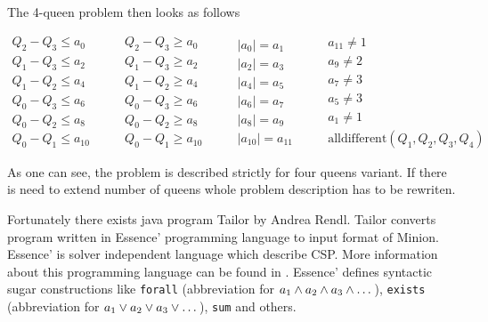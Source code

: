 The 4-queen problem then looks as follows

\begin{equation*}
\begin{gathered}
Q_2 - Q_3 \leq a_0 \\
Q_1 - Q_3 \leq a_2 \\
Q_1 - Q_2 \leq a_4 \\
Q_0 - Q_3 \leq a_6 \\
Q_0 - Q_2 \leq a_8 \\
Q_0 - Q_1 \leq a_{10}
\end{gathered} \qquad \begin{gathered}
Q_2 - Q_3 \geq a_0 \\
Q_1 - Q_3 \geq a_2 \\
Q_1 - Q_2 \geq a_4 \\
Q_0 - Q_3 \geq a_6 \\
Q_0 - Q_2 \geq a_8 \\
Q_0 - Q_1 \geq a_{10}
\end{gathered} \qquad \begin{gathered}
| a_0 | = a_1 \\
| a_2 | = a_3 \\
| a_4 | = a_5 \\
| a_6 | = a_7 \\
| a_8 | = a_9 \\
| a_{10} | = a_{11}
\end{gathered} \qquad \begin{gathered}
a_{11} \neq 1 \\
a_9 \neq 2 \\
a_7 \neq 3 \\
a_5 \neq 3 \\
a_1 \neq 1 \\
\text{alldifferent}(Q_1,Q_2,Q_3,Q_4)
\end{gathered}
\end{equation*}

As one can see, the problem is described strictly for four queens variant. If there is 
need to extend number of queens whole problem description has to be rewriten.

Fortunately there exists java program Tailor by Andrea Rendl. Tailor converts program
written in Essence' programming language to input format of Minion. Essence' is solver
independent language which describe CSP. More information about this programming language
can be found in \cite{constraints:essence}. Essence' defines syntactic sugar constructions
like \verb=forall= (abbreviation for $a_1 \wedge a_2 \wedge a_3 \wedge \dots$), 
\verb=exists= (abbreviation for $a_1 \vee a_2 \vee a_3 \vee \dots$), \verb=sum= and others.

